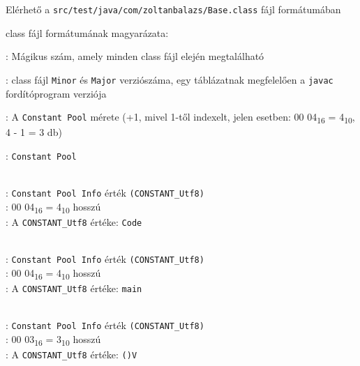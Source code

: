 Elérhető a \lstinline{src/test/java/com/zoltanbalazs/Base.class} fájl formátumában

class fájl formátumának magyarázata:

\begin{compactitem}
\setlength\itemsep{-5px}
\item {}: Mágikus szám, amely minden class fájl elején megtalálható
\item {} : class fájl \lstinline{Minor} és \lstinline{Major} verziószáma, egy táblázatnak megfelelően a \lstinline{javac} fordítóprogram verziója
\item {}: A \lstinline{Constant Pool} mérete (+1, mivel 1-től indexelt, jelen esetben: 00 04\textsubscript{16} = 4\textsubscript{10}, 4 - 1 = 3 db)
\item {}: \lstinline{Constant Pool}
\begin{compactitem}
    \setlength\itemsep{-5px}
    \item {}   \\
    : \lstinline{Constant Pool Info} érték \lstinline{(CONSTANT_Utf8)} \\
    : 00 04\textsubscript{16} = 4\textsubscript{10} hosszú \\
    : A \lstinline{CONSTANT_Utf8} értéke: \lstinline{Code}
    \item {}   \\
    : \lstinline{Constant Pool Info} érték \lstinline{(CONSTANT_Utf8)} \\
    : 00 04\textsubscript{16} = 4\textsubscript{10} hosszú \\
    : A \lstinline{CONSTANT_Utf8} értéke: \lstinline{main}
    \item {}   \\
    : \lstinline{Constant Pool Info} érték \lstinline{(CONSTANT_Utf8)} \\
    : 00 03\textsubscript{16} = 3\textsubscript{10} hosszú \\
    : A \lstinline{CONSTANT_Utf8} értéke: \lstinline{()V}
\end{compactitem}

\end{compactitem}
